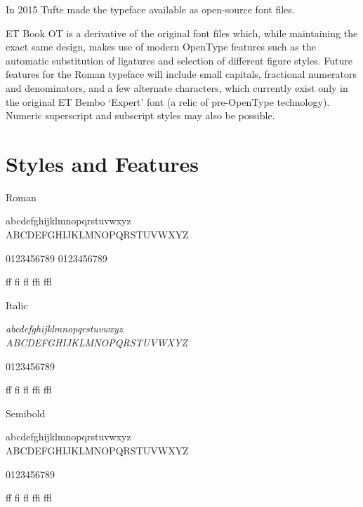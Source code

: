 \documentclass{scrartcl}
\begin{document}
In 2015 Tufte made the typeface available as open-source font files.

ET Book OT is a derivative of the original font files which, while maintaining the exact same design, makes use of modern OpenType features such as the automatic substitution of ligatures and selection of different figure styles. Future features for the Roman typeface will include small capitals, fractional numerators and denominators, and a few alternate characters, which currently exist only in the original ET Bembo `Expert' font (a relic of pre-OpenType technology). Numeric superscript and subscript styles may also be possible.

\clearpage

\section{Styles and Features}

\setlength{\parskip}{1em}
\setlength{\parindent}{0pt}

\newenvironment{style}[1]{\begin{minipage}[t]{6em}#1\end{minipage}\begin{minipage}[t]{30em}\bgroup\Large\setlength{\parskip}{0.6666em}}{\egroup\end{minipage}}

\begin{style}{Roman}
abcdefghijklmnopqrstuvwxyz \\
ABCDEFGHIJKLMNOPQRSTUVWXYZ

0123456789 \newline
{}
0123456789

ff fi fl ffi ffl
\end{style}


\begin{style}{Italic}\it
abcdefghijklmnopqrstuvwxyz \\
ABCDEFGHIJKLMNOPQRSTUVWXYZ

0123456789

ff fi fl ffi ffl
\end{style}


\begin{style}{Semibold}\semibold
abcdefghijklmnopqrstuvwxyz \\
ABCDEFGHIJKLMNOPQRSTUVWXYZ

0123456789

ff fi fl ffi ffl
\end{style}
\end{document}
